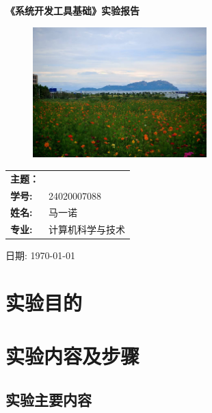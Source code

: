 \documentclass[a4paper]{article}
\begin{document}
 

\begin{titlepage}  
    \centering  
    \huge \textbf{《系统开发工具基础》实验报告}
    \vspace{5cm}  
    \begin{figure}[ht]
    \centering
    \includegraphics[width=0.6\textwidth]{images/face.jpg}
    \end{figure}
    
    \Large  
    \vspace{3cm} 
 
    \begin{tabular}{ll} 
        \textbf{主题：}& \\
        \cline{2-2} 
        \textbf{学号:} & 24020007088 \\ 
       \cline{2-2} 
        \textbf{姓名:} & 马一诺 \\  
        \cline{2-2} 
        \textbf{专业:} & 计算机科学与技术 \\  
       \cline{2-2} 
    \end{tabular}  
    \vspace{2cm}  
 
    \Large 日期: \today  
    
\end{titlepage}  

\tableofcontents


\newpage
{}
\section{实验目的}  

\section{实验内容及步骤}

\subsection{实验主要内容}
\end{document}
